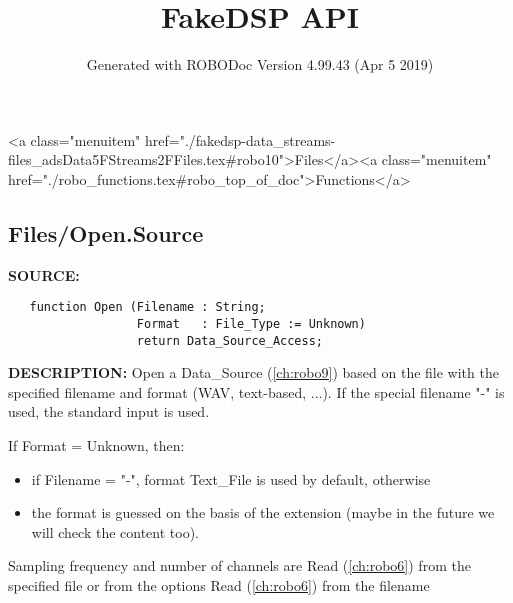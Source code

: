 \documentclass{article}
\title{FakeDSP API}
\author{Generated with ROBODoc Version 4.99.43 (Apr  5 2019)
}
\begin{document}
\maketitle
\printindex
\tableofcontents
\newpage

<a class="menuitem" href="./fakedsp-data_streams-files_adsData5FStreams2FFiles.tex#robo10">Files</a><a class="menuitem" href="./robo_functions.tex#robo_top_of_doc">Functions</a>\subsection{Files/Open.Source}
\textbf{SOURCE:}\hspace{0.08in}\begin{verbatim}
   function Open (Filename : String;
                  Format   : File_Type := Unknown)
                  return Data_Source_Access;
\end{verbatim}
\textbf{DESCRIPTION:}\hspace{0.08in}
   Open a Data\_Source (\ref{ch:robo9}) based on the file with the specified filename and
   format (WAV, text-based, ...).   If the special
   filename "-" is used, the standard input is used.



   If Format = Unknown, then:

\begin{itemize}
  \item    if Filename = "-", format Text\_File is used by default, otherwise
  \item    the format is guessed on the basis of the extension (maybe
     in the future we will check the content too).
\end{itemize}


   Sampling frequency and number of channels are Read (\ref{ch:robo6}) from the
   specified file or from the options Read (\ref{ch:robo6}) from the filename
\end{document}
